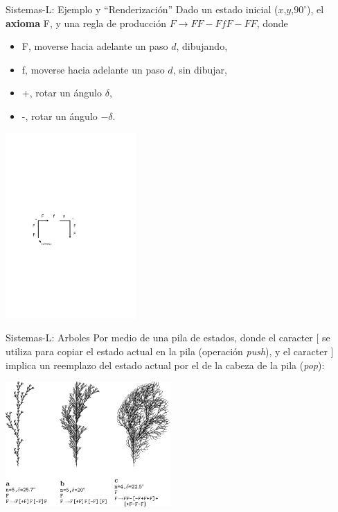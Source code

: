 \documentclass[spanish,unknownkeysallowed]{beamer}
\begin{document}
\begin{frame}{Sistemas-L: Ejemplo y ``Renderización''}
Dado un estado inicial ($x$,$y$,$90^{\circ}$), el \textbf{axioma} F, y una regla de producción $F \rightarrow FF-FfF-FF$, donde

\begin{itemize}
\item F, moverse hacia adelante un paso $d$, dibujando,
\item f, moverse hacia adelante un paso $d$, sin dibujar,
\item +, rotar un ángulo $\delta$,
\item -, rotar un ángulo $-\delta$.
\end{itemize}

\center
\includegraphics[width=5cm]{../figures/tortuga}

\end{frame}

\begin{frame}{Sistemas-L: Arboles}
Por medio de una pila de estados, donde el caracter $[$ se utiliza para copiar el estado actual en la pila (operación {\em push}), y el caracter $]$ implica un reemplazo del estado actual por el de la cabeza de la pila ({\em pop}):


\center
\includegraphics[width=6.3cm]{../figures/sistemalcorchete}

\end{frame}
\end{document}
